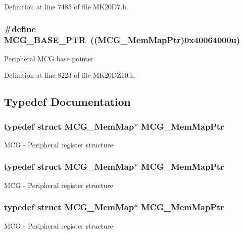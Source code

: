 Definition at line 7485 of file M\+K20\+D7.\+h.

\subsubsection[{\texorpdfstring{M\+C\+G\+\_\+\+B\+A\+S\+E\+\_\+\+P\+TR}{MCG_BASE_PTR}}]{\setlength{\rightskip}{0pt plus 5cm}\#define M\+C\+G\+\_\+\+B\+A\+S\+E\+\_\+\+P\+TR~(({\bf M\+C\+G\+\_\+\+Mem\+Map\+Ptr})0x40064000u)}\hypertarget{group___m_c_g___peripheral_gaceefc72e93a47a35f59a31c57dddf41b}{}\label{group___m_c_g___peripheral_gaceefc72e93a47a35f59a31c57dddf41b}
Peripheral M\+CG base pointer 

Definition at line 8223 of file M\+K20\+D\+Z10.\+h.



\subsection{Typedef Documentation}
\subsubsection[{\texorpdfstring{M\+C\+G\+\_\+\+Mem\+Map\+Ptr}{MCG_MemMapPtr}}]{\setlength{\rightskip}{0pt plus 5cm}typedef struct {\bf M\+C\+G\+\_\+\+Mem\+Map}$\ast$ {\bf M\+C\+G\+\_\+\+Mem\+Map\+Ptr}}\hypertarget{group___m_c_g___peripheral_ga1cb93dd00863c129e7753ec45a7c3563}{}\label{group___m_c_g___peripheral_ga1cb93dd00863c129e7753ec45a7c3563}
M\+CG -\/ Peripheral register structure 
\subsubsection[{\texorpdfstring{M\+C\+G\+\_\+\+Mem\+Map\+Ptr}{MCG_MemMapPtr}}]{\setlength{\rightskip}{0pt plus 5cm}typedef struct {\bf M\+C\+G\+\_\+\+Mem\+Map}$\ast$ {\bf M\+C\+G\+\_\+\+Mem\+Map\+Ptr}}\hypertarget{group___m_c_g___peripheral_ga1cb93dd00863c129e7753ec45a7c3563}{}\label{group___m_c_g___peripheral_ga1cb93dd00863c129e7753ec45a7c3563}
M\+CG -\/ Peripheral register structure 
\subsubsection[{\texorpdfstring{M\+C\+G\+\_\+\+Mem\+Map\+Ptr}{MCG_MemMapPtr}}]{\setlength{\rightskip}{0pt plus 5cm}typedef struct {\bf M\+C\+G\+\_\+\+Mem\+Map}$\ast$ {\bf M\+C\+G\+\_\+\+Mem\+Map\+Ptr}}\hypertarget{group___m_c_g___peripheral_ga1cb93dd00863c129e7753ec45a7c3563}{}\label{group___m_c_g___peripheral_ga1cb93dd00863c129e7753ec45a7c3563}
M\+CG -\/ Peripheral register structure 